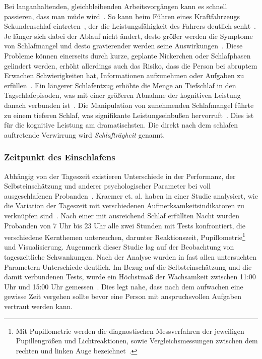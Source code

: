 Bei langanhaltenden, gleichbleibenden Arbeitsvorgängen kann es schnell passieren, dass man müde wird~\cite{dinges1985assessing,kraemer2000time}. So kann beim Führen eines Kraftfahrzeugs Sekundenschlaf eintreten~\cite{ruhle2008sekundenschlaf, muttray2010videoanalyse,mccartt2000factors}, der die Leistungsfähigkeit des Fahrers deutlich senkt~\cite{boyle2008driver}. Je länger sich dabei der Ablauf nicht ändert, desto größer werden die Symptome von Schlafmangel und desto gravierender werden seine Auswirkungen~\cite{boyle2008driver,mccartt2000factors}.
Diese Probleme können einerseits durch kurze, geplante Nickerchen oder Schlafphasen gelindert werden, erhöht allerdings auch das Risiko, dass die Person bei abruptem Erwachen Schwierigkeiten hat, Informationen aufzunehmen oder Aufgaben zu erfüllen~\cite{dinges1985assessing}. 
Ein längerer Schlafentzug erhöhte die Menge an Tiefschlaf in den Tagschlafepisoden, was mit einer größeren Abnahme der kognitiven Leistung danach verbunden ist~\cite{dinges1985assessing}. Die Manipulation von zunehmenden Schlafmangel führte zu einem tieferen Schlaf, was signifikante Leistungseinbußen hervorruft~\cite{dinges1985assessing}. Dies ist für die kognitive Leistung am dramatischsten. Die direkt nach dem schlafen auftretende Verwirrung wird \textit{Schlafträgheit} genannt.


\subsubsection{Zeitpunkt des Einschlafens}
Abhängig von der Tageszeit existieren Unterschiede in der Performanz, der Selbsteinschätzung und anderer psychologischer Parameter bei voll ausgeschlafenen Probanden~\cite{kraemer2000time}.
Kraemer et. al. haben in einer Studie analysiert, wie die Variation der Tageszeit mit verschiedenen Aufmerksamkeitsindikatoren zu verknüpfen sind~\cite{kraemer2000time}. 
Nach einer mit ausreichend Schlaf erfüllten Nacht wurden Probanden von 7 Uhr bis 23 Uhr alle zwei Stunden mit Tests konfrontiert, die verschiedene Kernthemen untersuchen, darunter Reaktionszeit, Pupillometrie\footnote{Mit Pupillometrie werden die diagnostischen Messverfahren der jeweiligen Pupillengrößen und Lichtreaktionen, sowie Vergleichsmessungen zwischen dem rechten und linken Auge bezeichnet~\cite{sachsenweger1975neuroophthalmologie}.} und Visualisierung.
Augenmerk dieser Studie lag auf der Beobachtung von tageszeitliche Schwankungen. Nach der Analyse wurden in fast allen untersuchten Parametern Unterschiede deutlich. 
Im Bezug auf die Selbsteinschätzung und die damit verbundenen Tests, wurde ein Höchstmaß der Wachsamkeit zwischen 11:00 Uhr und 15:00 Uhr gemessen~\cite{kraemer2000time}. Dies legt nahe, dass nach dem aufwachen eine gewisse Zeit vergehen sollte bevor eine Person mit anspruchsvollen Aufgaben vertraut werden kann.

